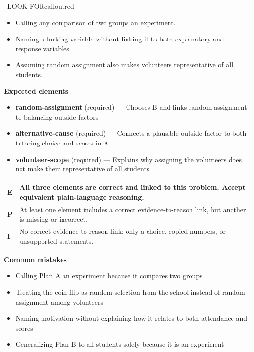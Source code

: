 \documentclass[11pt]{article}
\begin{document}
\begin{callout}{\IconWarn\ LOOK FOR}{calloutred}
\begin{itemize}[leftmargin=1.5em,itemsep=2pt,topsep=2pt]
  \item Calling any comparison of two groups an experiment.
  \item Naming a lurking variable without linking it to both explanatory and response variables.
  \item Assuming random assignment also makes volunteers representative of all students.
\end{itemize}
\end{callout}


\textbf{Expected elements}
\begin{itemize}[leftmargin=1.5em,itemsep=2pt,topsep=2pt]
  \item \textbf{random-assignment} (required) --- Chooses B and links random assignment to balancing outside factors
  \item \textbf{alternative-cause} (required) --- Connects a plausible outside factor to both tutoring choice and scores in A
  \item \textbf{volunteer-scope} (required) --- Explains why assigning the volunteers does not make them representative of all students
\end{itemize}

{\small\renewcommand{\arraystretch}{1.25}
\noindent\begin{tabular}{|p{0.5in}|p{5.9in}|}
\hline
\textbf{E} & All three elements are correct and linked to this problem. Accept equivalent plain-language reasoning. \\ \hline
\textbf{P} & At least one element includes a correct evidence-to-reason link, but another is missing or incorrect. \\ \hline
\textbf{I} & No correct evidence-to-reason link; only a choice, copied numbers, or unsupported statements. \\ \hline
\end{tabular}}

\textbf{Common mistakes}
\begin{itemize}[leftmargin=1.5em,itemsep=2pt,topsep=2pt]
  \item Calling Plan A an experiment because it compares two groups
  \item Treating the coin flip as random selection from the school instead of random assignment among volunteers
  \item Naming motivation without explaining how it relates to both attendance and scores
  \item Generalizing Plan B to all students solely because it is an experiment
\end{itemize}
\end{document}
